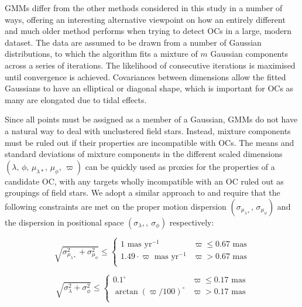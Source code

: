 GMMs differ from the other methods considered in this study in a number of ways, offering an interesting alternative viewpoint on how an entirely different and much older method performs when trying to detect OCs in a large, modern dataset. The data are assumed to be drawn from a number of Gaussian distributions, to which the algorithm fits a mixture of $m$ Gaussian components across a series of iterations. The likelihood of consecutive iterations is maximised until convergence is achieved. Covariances between dimensions allow the fitted Gaussians to have an elliptical or diagonal shape, which is important for OCs as many are elongated due to tidal effects.

Since all points must be assigned as a member of a Gaussian, GMMs do not have a natural way to deal with unclustered field stars. Instead, mixture components must be ruled out if their properties are incompatible with OCs. The means and standard deviations of mixture components in the different scaled dimensions $(\lambda, \, \phi, \, \mu_{\lambda*}, \, \mu_{\phi}, \, \varpi)$ can be quickly used as proxies for the properties of a candidate OC, with any targets wholly incompatible with an OC ruled out as groupings of field stars. We adopt a similar approach to \cite{cantat-gaudin_gaia_2019} and require that the following constraints are met on the proper motion dispersion $(\sigma_{\mu_{\lambda*}}, \, \sigma_{\mu_{\phi}})$ and the dispersion in positional space $(\sigma_{\lambda}, ,\ \sigma_{\phi})$ respectively:

\begin{equation}
\sqrt{\sigma_{\mu_{\lambda*}}^2+\sigma_{\mu_{\phi}}^2} \leq
  \begin{cases}
    1 \text{ mas yr}^{-1}                  & \varpi \leq 0.67 \text{ mas} \\
    1.49 \cdot \varpi \text{ mas yr}^{-1}  & \varpi >    0.67 \text{ mas} \\
  \end{cases} 
\end{equation}

\begin{equation}
\sqrt{\sigma_{\lambda}^2+\sigma_{\phi}^2} \leq
  \begin{cases}
    0.1 ^{\circ}                  & \varpi \leq 0.17 \text{ mas} \\
    \arctan(\varpi / 100)^{\circ} & \varpi >    0.17 \text{ mas} \\
  \end{cases} 
\end{equation}

